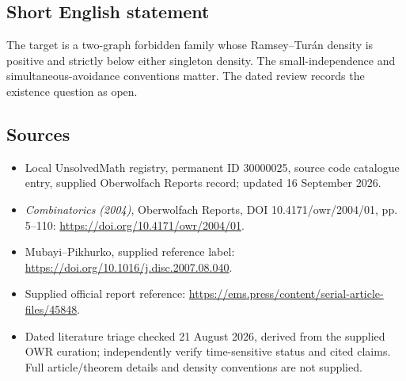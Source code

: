 \documentclass[11pt]{article}
\begin{document}
\subsection{Short English statement}
The target is a two-graph forbidden family whose Ramsey–Turán density is positive and strictly below either singleton density. The small-independence and simultaneous-avoidance conventions matter. The dated review records the existence question as open.
\subsection{Sources}
\begin{itemize}
\item Local UnsolvedMath registry, permanent ID 30000025, source code catalogue entry, supplied Oberwolfach Reports record; updated 16 September 2026.
\item \emph{Combinatorics (2004)}, Oberwolfach Reports, DOI 10.4171/owr/2004/01, pp. 5--110: \url{https://doi.org/10.4171/owr/2004/01}.
\item Mubayi--Pikhurko, supplied reference label: \url{https://doi.org/10.1016/j.disc.2007.08.040}.
\item Supplied official report reference: \url{https://ems.press/content/serial-article-files/45848}.
\item Dated literature triage checked 21 August 2026, derived from the supplied OWR curation; independently verify time-sensitive status and cited claims. Full article/theorem details and density conventions are not supplied.
\end{itemize}
\end{document}
